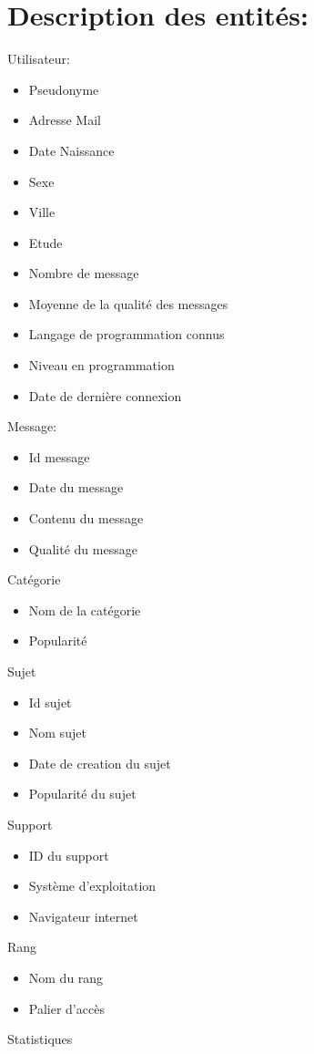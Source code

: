 \documentclass{report}
\begin{document}
\section{Description des entités:}
Utilisateur:
\begin{itemize}
		\item Pseudonyme
		\item Adresse Mail
		\item Date Naissance
		\item Sexe
		\item Ville
		\item Etude
		\item Nombre de message
		\item Moyenne de la qualité des messages
		\item Langage de programmation connus
		\item Niveau en programmation
		\item Date de dernière connexion
\end{itemize}
Message:
\begin{itemize}
	\item Id message
	\item Date du message
	\item Contenu du message
	\item Qualité du message
\end{itemize}
Catégorie
\begin{itemize}
	\item Nom de la catégorie
	\item Popularité
\end{itemize}
Sujet
\begin{itemize}
	\item Id sujet
   \item Nom sujet
	\item Date de creation du sujet
	\item Popularité du sujet
\end{itemize}
	Support
  \begin{itemize}
		\item ID du support
		\item Système d’exploitation
		\item Navigateur internet
  \end{itemize}
	Rang
  \begin{itemize}
		\item Nom du rang
		\item Palier d'accès
    \end{itemize}
	Statistiques
\end{document}
